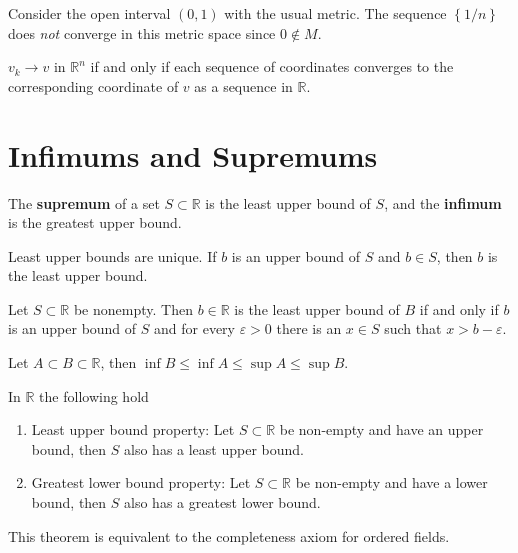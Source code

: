 \documentclass[10pt]{report}
\begin{document}
\begin{ex}[]
	Consider the open interval $(0,1)$ with the usual metric. The sequence $\left\{ 1/n \right\}$ does \textit{not} converge in this metric space since $0 \not\in M$.
\end{ex}

\begin{prop}
	$v_k \to v$ in $\mathbb{R}^n$ if and only if each sequence of coordinates converges to the corresponding coordinate of $v$ as a sequence in $\mathbb{R}$.
\end{prop}

\section{Infimums and Supremums}

\begin{defn}[]
	The \textbf{supremum} of a set $S \subset \mathbb{R}$ is the least upper bound of $S$, and the \textbf{infimum} is the greatest upper bound.
\end{defn}

Least upper bounds are unique. If $b$ is an upper bound of $S$ and $b \in S$, then $b$ is the least upper bound.

\begin{prop}
	Let $S \subset \mathbb{R}$ be nonempty. Then $b \in \mathbb{R}$ is the least upper bound of $B$ if and only if $b$ is an upper bound of $S$ and for every $\varepsilon > 0$ there is an $x \in S$ such that $x > b-\varepsilon$.
\end{prop}

\begin{prop}
	Let $A \subset B \subset \mathbb{R}$, then $\inf B \leq \inf A \leq \sup A \leq \sup B$.
\end{prop}

\begin{thrm}{}{}
	In $\mathbb{R}$ the following hold
	\begin{enumerate}
		\item Least upper bound property: Let $S \subset \mathbb{R}$ be non-empty and have an upper bound, then $S$ also has a least upper bound.
		\item Greatest lower bound property: Let $S \subset \mathbb{R}$ be non-empty and have a lower bound, then $S$ also has a greatest lower bound.
	\end{enumerate}
\end{thrm}
This theorem is equivalent to the completeness axiom for ordered fields.
\end{document}
